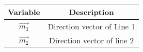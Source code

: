 \begin{tabular}[12pt]{ |c| c|}
    \hline
    \textbf{Variable} & \textbf{Description}\\ 
    \hline
    $\vec{m_1}$ & Direction vector of Line 1 \\
    \hline 
    $\vec{m_2}$ & Direction vector of line 2\\
    \hline   
    \end{tabular}

